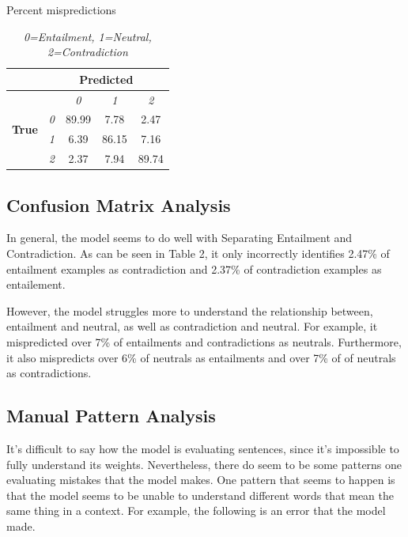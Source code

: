 \documentclass[twocolumn]{article}
\begin{document}
\begin{table}[]
\caption{Percent mispredictions}
\begin{tabular}{|l|cccc|}
\hline
                               & \multicolumn{4}{c|}{\textbf{Predicted}}                                                                          \\ \hline
\multirow{4}{*}{\textbf{True}} & \multicolumn{1}{l|}{}           & \multicolumn{1}{c|}{\textit{0}} & \multicolumn{1}{c|}{\textit{1}} & \textit{2} \\ \cline{2-5} 
                               & \multicolumn{1}{c|}{\textit{0}} & \multicolumn{1}{c|}{89.99}      & \multicolumn{1}{c|}{7.78}       & 2.47       \\ \cline{2-5} 
                               & \multicolumn{1}{c|}{\textit{1}} & \multicolumn{1}{c|}{6.39}       & \multicolumn{1}{c|}{86.15}      & 7.16       \\ \cline{2-5} 
                               & \multicolumn{1}{c|}{\textit{2}} & \multicolumn{1}{c|}{2.37}       & \multicolumn{1}{c|}{7.94}       & 89.74      \\ \hline
\end{tabular}
\caption*{\textit{ 0=Entailment, 1=Neutral, 2=Contradiction }}
\end{table}

\subsection{Confusion Matrix Analysis} 

In general, the model seems to do well with Separating Entailment and
Contradiction. As can be seen in Table 2, it only incorrectly identifies 2.47\%
of entailment examples as contradiction and 2.37\% of contradiction examples as
entailement.

However, the model struggles more to understand the relationship between,
entailment and neutral, as well as contradiction and neutral. For example, it
mispredicted over 7\% of entailments and contradictions as neutrals.
Furthermore, it also mispredicts over 6\% of neutrals as entailments and over
7\% of of neutrals as contradictions.

\subsection{Manual Pattern Analysis}

It's difficult to say how the model is evaluating sentences, since it's
impossible to fully understand its weights. Nevertheless, there do seem to be
some patterns one evaluating mistakes that the model makes. One pattern that
seems to happen is that the model seems to be unable to understand different
words that mean the same thing in a context. For example, the following is an
error that the model made. 
\end{document}
